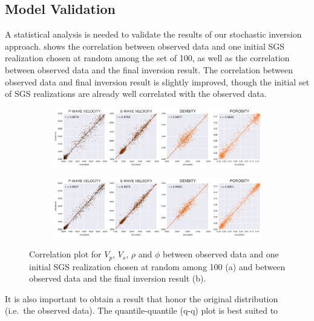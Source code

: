 \subsection{Model Validation}
A statistical analysis is needed to validate the results of our stochastic
inversion approach.  shows the correlation between
observed data and one initial SGS realization chosen at random among the set of
100, as well as the correlation between observed data and the final inversion
result. The correlation between observed data and final inversion result is
slightly improved, though the initial set of SGS realizations are already well
correlated with the observed data.
\begin{figure}[!ht]
        \centering
        \begin{subfigure}[b]{1\textwidth}
        		\caption{}
                \includegraphics[width=\textwidth]{fig/correlation_a.pdf}
                \label{fig:correlation_a}
        \end{subfigure}%

        \begin{subfigure}[b]{1\textwidth}
                \caption{}
                \includegraphics[width=\textwidth]{fig/correlation_b.pdf}
                \label{fig:correlation_b}
        \end{subfigure}
		\caption{Correlation plot for $V_p$, $V_s$, $\rho$ and $\phi$ between observed
data and one initial SGS realization chosen at random among 100 (a) and between
observed data and the final inversion result (b).}
		\label{fig:correlation}
\end{figure}
It is also important to obtain a result that honor the original distribution
(i.e.\ the observed data). The quantile-quantile (q-q) plot is best suited to

